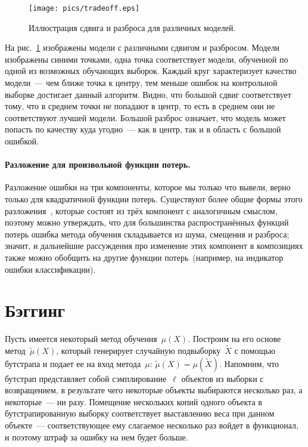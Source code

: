 \documentclass[12pt,fleqn]{article}
\begin{document}
\begin{figure}[t]
    \centering
    \texttt{[image: pics/tradeoff.eps]}
    \caption{Иллюстрация сдвига и разброса для различных моделей.}
    \label{fig:tradeoff}
\end{figure}

На рис.~\ref{fig:tradeoff} изображены модели с различными сдвигом и разбросом.
Модели изображены синими точками, одна точка соответствует модели,
обученной по одной из возможных обучающих выборок.
Каждый круг характеризует качество модели~--- чем ближе точка к центру,
тем меньше ошибок на контрольной выборке достигает данный алгоритм.
Видно, что большой сдвиг соответствует тому, что в среднем точки не попадают в центр,
то есть в среднем они не соответствуют лучшей модели.
Большой разброс означает, что модель может попасть по качеству куда угодно~---
как в центр, так и в область с большой ошибкой.

\paragraph{Разложение для произвольной функции потерь.}
Разложение ошибки на три компоненты, которое мы только что вывели, верно
только для квадратичной функции потерь.
Существуют более общие формы этого разложения~\cite{domingos00unified},
которые состоят из трёх компонент с аналогичным смыслом,
поэтому можно утверждать, что для большинства распространённых функций потерь
ошибка метода обучения складывается из шума, смещения и разброса;
значит, и дальнейшие рассуждения про изменение этих компонент в композициях
также можно обобщить на другие функции потерь~(например, на индикатор ошибки классификации).

\section{Бэггинг}
Пусть имеется некоторый метод обучения~$\mu(X)$.
Построим на его основе метод~$\tilde \mu(X)$, который
генерирует случайную подвыборку~$\tilde X$ с помощью бутстрапа
и подает ее на вход метода~$\mu$: $\tilde \mu(X) = \mu(\tilde X)$.
Напомним, что бутстрап представляет собой сэмплирование~$\ell$ объектов из выборки
с возвращением, в результате чего некоторые объекты выбираются несколько
раз, а некоторые~--- ни разу.
Помещение нескольких копий одного объекта в бутстрапированную выборку
соответствует выставлению веса при данном объекте~--- соответствующее ему
слагаемое несколько раз войдет в функционал, и поэтому штраф
за ошибку на нем будет больше.
\end{document}
